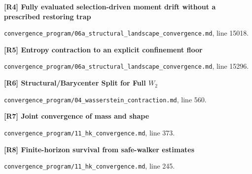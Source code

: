 \documentclass[11pt,a4paper]{article}
\begin{document}
\par\medskip\noindent\begin{minipage}{\linewidth}\textbf{[R4] Fully evaluated selection-driven moment drift without a prescribed restoring trap}\label{src:thm-slceg-full-moment}\par
{\small\texttt{}\par
\nolinkurl{convergence_program/06a_structural_landscape_convergence.md}, line 15018.\par}
\end{minipage}\par

\par\medskip\noindent\begin{minipage}{\linewidth}\textbf{[R5] Entropy contraction to an explicit confinement floor}\label{src:thm-slce-entropy-floor}\par
{\small\texttt{}\par
\nolinkurl{convergence_program/06a_structural_landscape_convergence.md}, line 15296.\par}
\end{minipage}\par

\par\medskip\noindent\begin{minipage}{\linewidth}\textbf{[R6] Structural/Barycenter Split for Full \(W_2\)}\label{src:thm-full-w2-split}\par
{\small\texttt{}\par
\nolinkurl{convergence_program/04_wasserstein_contraction.md}, line 560.\par}
\end{minipage}\par

\par\medskip\noindent\begin{minipage}{\linewidth}\textbf{[R7] Joint convergence of mass and shape}\label{src:thm-hk-convergence-main-assembly}\par
{\small\texttt{}\par
\nolinkurl{convergence_program/11_hk_convergence.md}, line 373.\par}
\end{minipage}\par

\par\medskip\noindent\begin{minipage}{\linewidth}\textbf{[R8] Finite-horizon survival from safe-walker estimates}\label{src:thm-exponential-survival}\par
{\small\texttt{}\par
\nolinkurl{convergence_program/11_hk_convergence.md}, line 245.\par}
\end{minipage}\par
\end{document}
